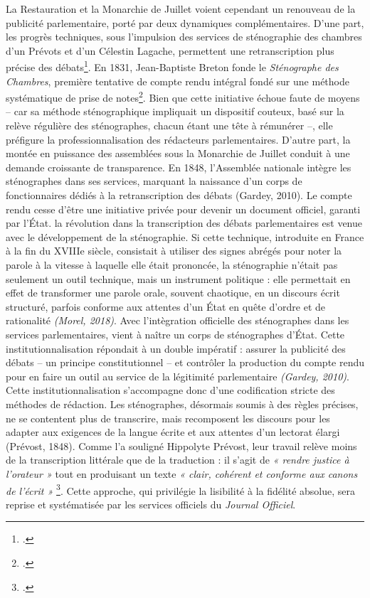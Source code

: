 La Restauration et la Monarchie de Juillet voient cependant un renouveau de la publicité parlementaire, porté par deux dynamiques complémentaires. D’une part, les progrès techniques, sous l'impulsion des services de sténographie des chambres d'un Prévots et d'un Célestin Lagache, permettent une retranscription plus précise des débats\footcite[][]{coniez}. En 1831, Jean-Baptiste Breton fonde le \emph{Sténographe des Chambres}, première tentative de compte rendu intégral fondé sur une méthode systématique de prise de notes\footcite[][]{coniez}. Bien que cette initiative échoue faute de moyens -- car sa méthode sténographique impliquait un dispositif couteux, basé sur la relève régulière des sténographes, chacun étant une tête à rémunérer --, elle préfigure la professionnalisation des rédacteurs parlementaires. D’autre part, la montée en puissance des assemblées sous la Monarchie de Juillet conduit à une demande croissante de transparence. En 1848, l’Assemblée nationale intègre les sténographes dans ses services, marquant la naissance d’un corps de fonctionnaires dédiés à la retranscription des débats (Gardey, 2010). Le compte rendu cesse d’être une initiative privée pour devenir un document officiel, garanti par l’État. la révolution dans la transcription des débats parlementaires est venue avec le développement de la sténographie. Si cette technique, introduite en France à la fin du XVIIIe siècle, consistait à utiliser des signes abrégés pour noter la parole à la vitesse à laquelle elle était prononcée, la sténographie n’était pas seulement un outil technique, mais un instrument politique : elle permettait en effet de transformer une parole orale, souvent chaotique, en un discours écrit structuré, parfois conforme aux attentes d’un État en quête d’ordre et de rationalité \emph{(Morel, 2018)}. Avec l'intègration officielle des sténographes dans les services parlementaires, vient à naître un corps de sténographes d’État. Cette institutionnalisation répondait à un double impératif : assurer la publicité des débats -- un principe constitutionnel -- et contrôler la production du compte rendu pour en faire un outil au service de la légitimité parlementaire \emph{(Gardey, 2010)}.  Cette institutionnalisation s’accompagne donc d’une codification stricte des méthodes de rédaction. Les sténographes, désormais soumis à des règles précises, ne se contentent plus de transcrire, mais recomposent les discours pour les adapter aux exigences de la langue écrite et aux attentes d’un lectorat élargi (Prévost, 1848). Comme l’a souligné Hippolyte Prévost, leur travail relève moins de la transcription littérale que de la traduction : il s’agit de \emph{« rendre justice à l’orateur »} tout en produisant un texte \emph{« clair, cohérent et conforme aux canons de l’écrit »} \footcite[][]{morel}. Cette approche, qui privilégie la lisibilité à la fidélité absolue, sera reprise et systématisée par les services officiels du \emph{Journal Officiel}.

